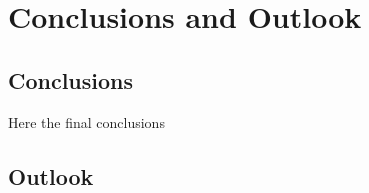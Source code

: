 \chapter{\label{ch:conclusions} Conclusions and Outlook}

\minitoc

\section{Conclusions}\label{conclusions:sec:conclusions}

Here the final conclusions


\section{Outlook}\label{conclusions:sec:outlook}